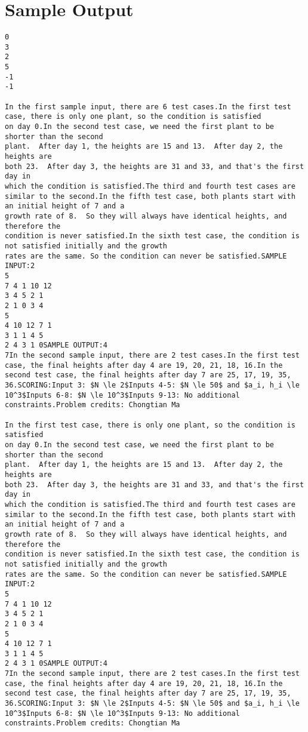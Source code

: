 \documentclass[12pt]{article}
\begin{document}
\section*{Sample Output}
\begin{verbatim}
0
3
2
5
-1
-1

In the first sample input, there are 6 test cases.In the first test case, there is only one plant, so the condition is satisfied
on day 0.In the second test case, we need the first plant to be shorter than the second
plant.  After day 1, the heights are 15 and 13.  After day 2, the heights are
both 23.  After day 3, the heights are 31 and 33, and that's the first day in
which the condition is satisfied.The third and fourth test cases are similar to the second.In the fifth test case, both plants start with an initial height of 7 and a
growth rate of 8.  So they will always have identical heights, and therefore the
condition is never satisfied.In the sixth test case, the condition is not satisfied initially and the growth
rates are the same. So the condition can never be satisfied.SAMPLE INPUT:2
5
7 4 1 10 12
3 4 5 2 1
2 1 0 3 4
5
4 10 12 7 1
3 1 1 4 5
2 4 3 1 0SAMPLE OUTPUT:4
7In the second sample input, there are 2 test cases.In the first test case, the final heights after day 4 are 19, 20, 21, 18, 16.In the second test case, the final heights after day 7 are 25, 17, 19, 35, 36.SCORING:Input 3: $N \le 2$Inputs 4-5: $N \le 50$ and $a_i, h_i \le 10^3$Inputs 6-8: $N \le 10^3$Inputs 9-13: No additional constraints.Problem credits: Chongtian Ma

In the first test case, there is only one plant, so the condition is satisfied
on day 0.In the second test case, we need the first plant to be shorter than the second
plant.  After day 1, the heights are 15 and 13.  After day 2, the heights are
both 23.  After day 3, the heights are 31 and 33, and that's the first day in
which the condition is satisfied.The third and fourth test cases are similar to the second.In the fifth test case, both plants start with an initial height of 7 and a
growth rate of 8.  So they will always have identical heights, and therefore the
condition is never satisfied.In the sixth test case, the condition is not satisfied initially and the growth
rates are the same. So the condition can never be satisfied.SAMPLE INPUT:2
5
7 4 1 10 12
3 4 5 2 1
2 1 0 3 4
5
4 10 12 7 1
3 1 1 4 5
2 4 3 1 0SAMPLE OUTPUT:4
7In the second sample input, there are 2 test cases.In the first test case, the final heights after day 4 are 19, 20, 21, 18, 16.In the second test case, the final heights after day 7 are 25, 17, 19, 35, 36.SCORING:Input 3: $N \le 2$Inputs 4-5: $N \le 50$ and $a_i, h_i \le 10^3$Inputs 6-8: $N \le 10^3$Inputs 9-13: No additional constraints.Problem credits: Chongtian Ma


\end{verbatim}
\end{document}
